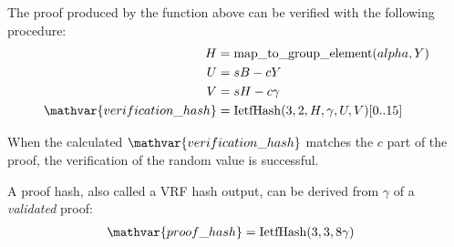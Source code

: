 The proof produced by the function above can be verified with the following procedure:
\begin{align*}
	H &= \mathfunc{map\_to\_group\_element}(alpha, Y) \\
	U &= sB - cY \\
	V &= sH - c \gamma \\
	\mathvar{verification\_hash} &= \mathfunc{IetfHash}(3, 2, H, \gamma, U, V)[0..15]
\end{align*}

When the calculated $\mathvar{verification\_hash}$ matches the $c$ part of the proof, the verification of the random value is successful.

A proof hash, also called a VRF hash output, can be derived from $\gamma$ of a \emph{validated} proof:
\begin{align}
	\mathvar{proof\_hash} &= \mathfunc{IetfHash}(3, 3, 8 \gamma) \label{eq:cryptography:proofHash}
\end{align}
